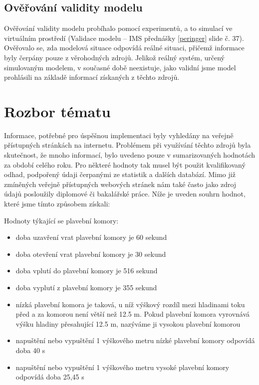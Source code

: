\documentclass[11pt,a4paper]{article}
\begin{document}
    \subsection{Ověřování validity modelu}

      Ověřování validity modelu probíhalo pomocí experimentů, a to simulací ve
      virtuálním prostředí (Validace modelu -- IMS přednášky \ref{peringer}
      slide č. 37). Ověřovalo se, zda modelová situace odpovídá reálné situaci,
      přičemž informace byly čerpány pouze z věrohodných zdrojů.
      Jelikož reálný systém, určený simulovaným modelem, v současné době
      neexistuje, jako validní jsme model prohlásili na základě
      informací získaných z těchto zdrojů.

  \section{Rozbor tématu}

    Informace, potřebné pro úspěšnou implementaci byly vyhledány na veřejně
    přístupných stránkách na internetu. Problémem při využívání těchto zdrojů
    byla skutečnost, že mnoho informací, bylo uvedeno pouze v sumarizovaných
    hodnotách za období celého roku.  Pro některé hodnoty tak musel být použit
    kvalifikovaný odhad, podpořený údaji čerpanými ze statistik a dalších
    databází. Mimo již zmíněných veřejně přístupných webových stránek nám také
    často jako zdroj údajů posloužily diplomové či bakalářské práce. Níže je
    uveden souhrn hodnot, které jsme tímto způsobem získali:

    \noindent
    Hodnoty týkající se plavební komory:

    \begin{itemize}
      \item doba uzavření vrat plavební komory je 60 sekund
      \item doba otevření vrat plavební komory je 30 sekund
      \item doba vplutí do plavební komory je 516 sekund
      \item doba vyplutí z plavební komory je 355 sekund
      \item nízká plavební komora je taková, u níž výškový rozdíl mezi
            hladinami toku před a za komorou není větší než 12.5 m.
            Pokud plavební komora vyrovnává výšku hladiny přesahující 12.5 m,
            nazýváme ji vysokou plavební komorou
      \item napuštění nebo vypuštění 1 výškového metru nízké plavební komory
            odpovídá doba 40 s
      \item napuštění nebo vypuštění 1 výškového metru  vysoké plavební komory
            odpovídá doba 25,45 s
    \end{itemize}
\end{document}
